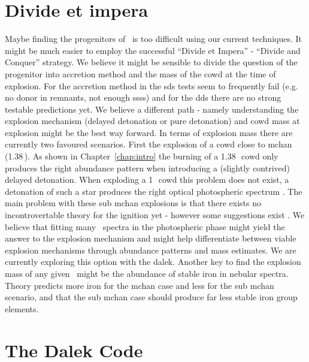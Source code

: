\section{Divide et impera}

Maybe finding the progenitors of \sneia\ is too difficult using our current techniques. It might be much easier to employ the successful ``Divide et Impera'' - ``Divide and Conquer'' strategy. We believe it might be sensible to divide the question of the progenitor into accretion method and the mass of the \gls{cowd} at the time of explosion. For the accretion method in the \gls{sds} tests seem to frequently fail (e.g. no donor in remnants, not enough \glspl{sss}) and for the \gls{dds} there are no strong testable predictions yet. We believe a different path - namely understanding the explosion mechanism (delayed detonation or pure detonation) and \gls{cowd} mass at explosion might be the best way forward.  In terms of explosion mass there are currently two favoured scenarios. First the explosion of a \gls{cowd} close to \gls{mchan} (1.38\,\msun). As shown in Chapter~\ref{chap:intro} the burning of a 1.38\,\msun\ \gls{cowd} only produces the right abundance pattern when introducing a (slightly contrived) delayed detonation. When exploding a 1\,\msun\ \gls{cowd} this problem does not exist, a detonation of such a star produces the right optical photospheric spectrum \citep{2010ApJ...714L..52S}. The main problem with these sub \gls{mchan} explosions is that there exists no incontrovertable theory for the ignition yet - however some suggestions exist \citep[e.g.][]{2010A&A...514A..53F}. 
We believe that fitting many \snia\ spectra in the photospheric phase might yield the answer to the explosion mechanism and might help differentiate between viable explosion mechanisms through abundance patterns and mass estimates. We are currently exploring this option with the \gls{dalek}.
Another key to find the explosion mass of any given \snia\ might be the abundance of stable iron in nebular spectra. Theory predicts more iron for the \gls{mchan} case and less for the  sub \gls{mchan} scenario, and that the sub \gls{mchan} case should produce far less stable iron group elements.

\section{The Dalek Code}

